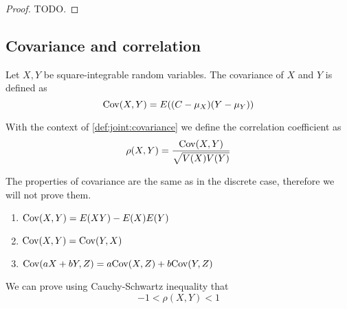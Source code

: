 \documentclass[12pt]{extarticle}
\newcommand{\cov}{{\operatorfont Cov}}
\begin{document}
\begin{proof}
    TODO.
\end{proof}

\subsection{Covariance and correlation}

\begin{definition}[covariance]
    \label{def:joint:covariance}
    Let $X, Y$ be square-integrable random variables.
    The covariance of $X$ and $Y$ is defined as
    \begin{equation}
        \cov(X, Y) = E((C - \mu_X)(Y- \mu_Y))
    \end{equation}
\end{definition}

\begin{definition}
    With the context of \autoref{def:joint:covariance} we define the correlation coefficient as
    \begin{equation}
        \rho(X, Y) = \frac{\cov (X, Y)}{\sqrt{V(X)V(Y)}}
    \end{equation}
\end{definition}


\begin{proposition}
    \label{prop:joint:properties_covariance}

    The properties of covariance are the same as in the discrete case, therefore we will not prove them.

    \begin{enumerate}
        \item $\cov(X, Y) = E(XY) - E(X)E(Y)$
        \item $\cov(X,Y) = \cov(Y,X)$
        \item $\cov(aX + bY, Z) = a \cov(X, Z) + b \cov(Y, Z)$
    \end{enumerate}
\end{proposition}

\begin{proposition}
    We can prove using Cauchy-Schwartz inequality that
    \begin{equation}
        -1 < \rho(X, Y) < 1
    \end{equation}
\end{proposition}

\end{document}
